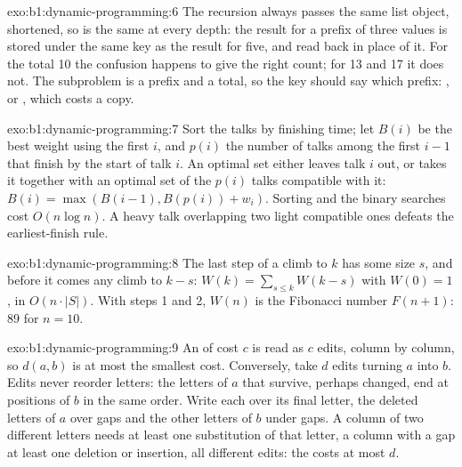 \begin{solution}{exo:b1:dynamic-programming:6}
The recursion always passes the same list object, shortened, so  is the same at every depth: the result
for a prefix of three values is stored under the same key as the result for five, and read back in place of it. For
the total 10 the confusion happens to give the right count; for 13 and 17 it does not. The subproblem is a prefix and a
total, so the key should say which prefix: , or , which costs
a copy.
\end{solution}

\begin{solution}{exo:b1:dynamic-programming:7}
Sort the talks by finishing time; let $B(i)$ be the best weight using the first $i$, and $p(i)$ the number of talks among
the first $i - 1$ that finish by the start of talk $i$. An optimal set either leaves talk $i$ out, or takes it together
with an optimal set of the $p(i)$ talks compatible with it: $B(i) = \max(B(i - 1), B(p(i)) + w_i)$. Sorting and the
binary searches cost $O(n \log n)$. A heavy talk overlapping two light compatible ones defeats the earliest-finish rule.
\end{solution}

\begin{solution}{exo:b1:dynamic-programming:8}
The last step of a climb to $k$ has some size $s$, and before it comes any climb to $k - s$: $W(k) = \sum_{s \leq k}
W(k - s)$ with $W(0) = 1$, in $O(n \cdot |S|)$. With steps 1 and 2, $W(n)$ is the Fibonacci number $F(n + 1)$: 89 for
$n = 10$.
\end{solution}

\begin{solution}{exo:b1:dynamic-programming:9}
An  of cost $c$ is read as $c$ edits, column by column, so $d(a, b)$ is at most the smallest cost. Conversely,
take $d$ edits turning $a$ into $b$. Edits never reorder letters: the letters of $a$ that survive, perhaps changed, end
at positions of $b$ in the same order. Write each over its final letter, the deleted letters of $a$ over gaps and the
other letters of $b$ under gaps. A column of two different letters needs at least one substitution of that letter, a
column with a gap at least one deletion or insertion, all different edits: the  costs at most $d$.
\end{solution}

